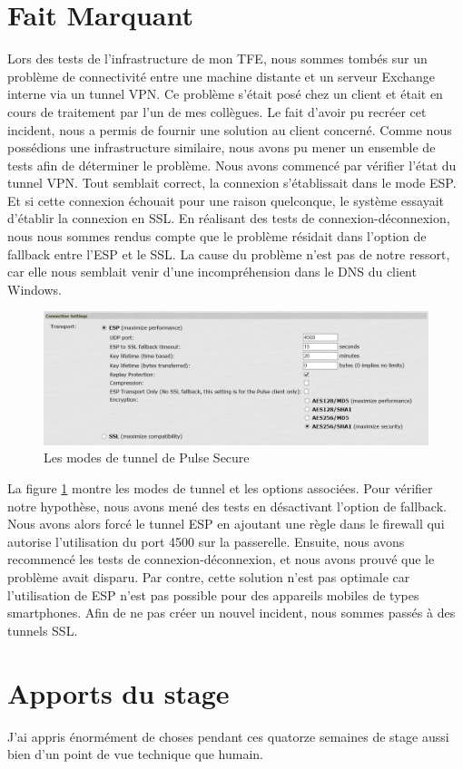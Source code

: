 \section{Fait Marquant}
Lors des tests de l'infrastructure de mon TFE, nous sommes tombés sur un problème de connectivité entre une machine distante et un serveur Exchange interne via un tunnel VPN. 
Ce problème s'était posé chez un client et était en cours de traitement par l'un de mes collègues.
Le fait d'avoir pu recréer cet incident, nous a permis de fournir une solution au client concerné. 
Comme nous possédions une infrastructure similaire, nous avons pu mener un ensemble de tests afin de déterminer le problème.
Nous avons commencé par vérifier l'état du tunnel VPN.
Tout semblait correct, la connexion s'établissait dans le mode ESP.
Et si cette connexion échouait pour une raison quelconque, le système essayait d'établir la connexion en SSL.
En réalisant des tests de connexion-déconnexion, nous nous sommes rendus compte que le problème résidait dans l'option de fallback entre l'ESP et le SSL.
La cause du problème n'est pas de notre ressort, car elle nous semblait venir d'une incompréhension dans le DNS du client Windows.
\begin{figure}[!h]
\centering
\includegraphics[width=16cm]{fallbabkssl.png}
\caption{Les modes de tunnel de Pulse Secure}
\label{fig:ssl}
\end{figure}
La figure \ref{fig:ssl} montre les modes de tunnel et les options associées.
Pour vérifier notre hypothèse, nous avons mené des tests en désactivant l'option de fallback.
Nous avons alors forcé le tunnel ESP en ajoutant une règle dans le firewall qui autorise l'utilisation du port 4500 sur la passerelle.
Ensuite, nous avons recommencé les tests de connexion-déconnexion, et nous avons prouvé que le problème avait disparu.
Par contre, cette solution n'est pas optimale car l'utilisation de ESP n'est pas possible pour des appareils mobiles de types smartphones.
Afin de ne pas créer un nouvel incident, nous sommes passés à des tunnels SSL. 

\section{Apports du stage}
J'ai appris énormément de choses pendant ces quatorze semaines de stage aussi bien d'un point de vue technique que humain.

